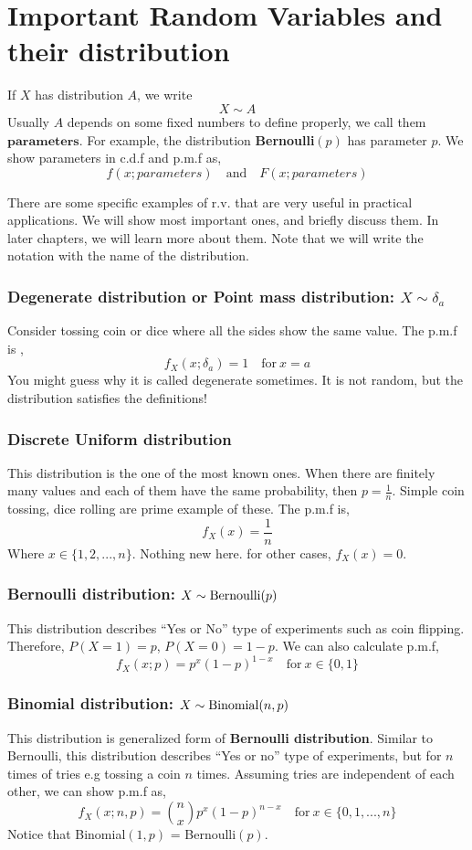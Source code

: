 \section{Important Random Variables and their distribution}
\begin{definition}
    If $X$ has distribution $A$, we write
    \[ X \sim A\]
    Usually $A$ depends on some fixed numbers to define properly, we call them $\textbf{parameters}$. For example, the distribution \textbf{Bernoulli}$(p)$ has parameter $p$. We show parameters in c.d.f and p.m.f as,
    \[ f(x; parameters) \quad \text{and} \quad F(x; parameters) \]
    
\end{definition}
There are some specific examples of r.v. that are very useful in practical applications. We will show most important ones, and briefly discuss them. In later chapters, we will learn more about them. Note that we will write the notation with the name of the distribution.

\subsubsection{Degenerate distribution or Point mass distribution: $X \sim \delta_a$}
Consider tossing coin or dice where all the sides show the same value. The p.m.f is ,
\[f_X(x; \delta_a) = 1 \quad \text{for} \ x = a\]
You might guess why it is called degenerate sometimes. It is not random, but the distribution satisfies the definitions!
\subsubsection{Discrete Uniform distribution}
This distribution is the one of the most known ones. When there are finitely many values and each of them have the same probability, then $p = \frac{1}{n}$. Simple coin tossing, dice rolling are prime example of these. The p.m.f is,
\[f_X(x) = \frac{1}{n}\]
Where $x \in \{1,2,...,n \}$. Nothing new here.
for other cases, $f_X(x) = 0$. 
\subsubsection*{Bernoulli distribution: $X \sim \operatorname{Bernoulli}(p)$ }
This distribution describes ``Yes or No'' type of experiments such as coin flipping. Therefore, $P(X = 1) = p$, $P(X = 0) = 1-p$. We can also calculate p.m.f,
\[f_X(x; p) = p^x(1-p)^{1-x} \quad \text{for} \ x \in \{0,1\}\]

\subsubsection*{Binomial distribution:  $ X \sim \operatorname{Binomial}(n,p)$}
This distribution is generalized form of \textbf{Bernoulli distribution}. Similar to Bernoulli, this distribution describes ``Yes or no'' type of experiments, but for $n$ times of tries e.g tossing a coin $n$ times. Assuming tries are independent of each other, we can show p.m.f as,
\[f_X(x; n,p) = \binom{n}{x}p^x(1-p)^{n-x} \quad \text{for} \ x \in \{0,1,...,n\}\]
Notice that Binomial$(1,p)$ = Bernoulli$(p)$.
